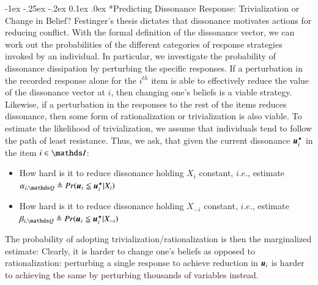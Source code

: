 \documentclass[onecolumn, compsoc,11pt]{IEEEtran}
\makeatletter
\renewcommand\subsection{\@startsection {section}{1}{\z@}%
                                   {-1ex \@plus -.25ex \@minus -.2ex}%
                                   {0.1ex \@plus.0ex}%
                                   {\fontsize{11}{10}\selectfont\bfseries\sffamily\color{DodgerBlue4}}}
\makeatother
\begin{document}
\subsection*{Predicting Dissonance Response: Trivialization or Change in Belief?}
Festinger's thesis dictates that dissonance motivates actions for reducing conflict. With the formal definition of  the dissonance vector, we can work out the probabilities of the different categories of  response strategies invoked by an individual. %
In particular, we investigate the probability of  dissonance dissipation by perturbing the specific responses. If a perturbation in the recorded response alone for the $i^{th}$ item is able to effectively reduce the value of the dissonance vector at $i$, then changing one's beliefs is a viable strategy. Likewise, if  a perturbation in  the responses to the rest of the items  reduces dissonance, then  some form of rationalization or trivialization is also viable.
To estimate the likelihood of trivialization, we assume that individuals tend to follow the path of least resistance.  Thus, we ask, that given the current dissonance $ \boldsymbol{u}_i^\star$ in the item $i \in \I$:
\begin{itemize}
\item How hard is it to reduce dissonance holding  $X_i$ constant, $i.e.$, estimate $\alpha_{i,\Q} \triangleq Pr(\u_i \leqq \u_i^\star \vert X_i)$
  \item How hard is it to reduce dissonance holding $X_{-i}$ constant, $i.e.$, estimate $\beta_{i,\Q} \triangleq Pr(\u_i \leqq \u_i^\star \vert X_{-i})$
  \end{itemize}
  The  probability of  adopting trivialization/rationalization is then the marginalized estimate:
Clearly, it is harder to change one's beliefs as opposed to rationalization: perturbing a single response to achieve reduction in $\boldsymbol{u}_i$ is  harder to achieving the same by perturbing thousands of variables instead.
\end{document}
